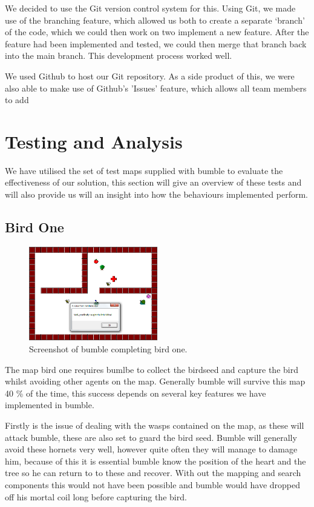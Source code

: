 \documentclass[a4paper,oneside]{report}
\begin{document}
We decided to use the Git version control system for this. Using Git, we made use of the branching feature, which allowed us both to create a separate `branch' of the code, which we could then work on two implement a new feature. After the feature had been implemented and tested, we could then merge that branch back into the main branch. This development process worked well.

We used Github to host our Git repository. As a side product of this, we were also able to make use of Github's 'Issues' feature, which allows all team members to add 
	
\section{Testing and Analysis}

We have utilised the set of test maps supplied with bumble to evaluate the effectiveness of our solution, this section will give an overview of these tests and will also provide us will an insight into how the behaviours implemented perform.
	
	\subsection{Bird One}

		\begin{figure}[h!]
		  \centering
			\includegraphics[width=0.5\textwidth]{bumbleBird1.png}
			\caption{Screenshot of bumble completing bird one.}
		\end{figure}


	The map bird one requires bumlbe to collect the birdseed and capture the bird whilst avoiding other agents on the map.  Generally bumble will survive this map 40 \% of the time, this success depends on several key features we have implemented in bumble. 
	
	Firstly is the issue of dealing with the wasps contained on the map, as these will attack bumble, these are also set to guard the bird seed. Bumble will generally avoid these hornets very well, however quite often they will manage to damage him, because of this it is essential bumble know the position of the heart and the tree so he can return to to these and recover. With out the mapping and search components this would not have been possible and bumble would have dropped off his mortal coil long before capturing the bird. 
	
\end{document}
